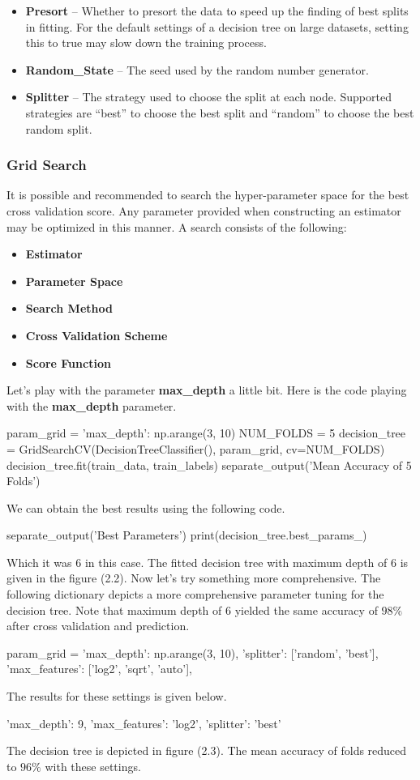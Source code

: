 \documentclass[12pt]{article}
\numberwithin{equation}{section}
\numberwithin{table}{section}
\numberwithin{figure}{section}
\begin{document}
\begin{itemize}
	\item \textbf{Presort} -- Whether to presort the data to speed up the finding of best splits in fitting. For the default settings of a decision tree on large datasets, setting this to true may slow down the training process.
	\item \textbf{Random\_State} -- The seed used by the random number generator.
	\item \textbf{Splitter} -- The strategy used to choose the split at each node. Supported strategies are “best” to choose the best split and “random” to choose the best random split.
\end{itemize}
\subsubsection{Grid Search}
It is possible and recommended to search the hyper-parameter space for the best cross validation score. Any parameter provided when constructing an estimator may be optimized in this manner\cite{scklearn2}. A search consists of the following: 
\begin{itemize}
	\item \textbf{Estimator}
	\item \textbf{Parameter Space}
	\item  \textbf{Search Method}
	\item \textbf{Cross Validation Scheme}
	\item \textbf{Score Function}
\end{itemize}
Let's play with the parameter \textbf{max\_depth} a little bit. Here is the code playing with the \textbf{max\_depth} parameter.
\begin{python}
	param_grid = {
		'max_depth': np.arange(3, 10)
	}
	NUM_FOLDS = 5
	decision_tree = GridSearchCV(DecisionTreeClassifier(), param_grid, cv=NUM_FOLDS)
	decision_tree.fit(train_data, train_labels)
	separate_output('Mean Accuracy of 5 Folds')
\end{python}
We can obtain the best results using the following code.
\begin{python}
	separate_output('Best Parameters')
	print(decision_tree.best_params_)
\end{python}
Which it was $6$ in this case. The fitted decision tree with maximum depth of $6$ is given in the figure (2.2). Now let's try something more comprehensive. The following dictionary depicts a more comprehensive parameter tuning for the decision tree. Note that maximum depth of $6$ yielded the same accuracy of $98\%$ after cross validation and prediction.
\begin{python}
	param_grid = {
		'max_depth': np.arange(3, 10),
		'splitter': ['random', 'best'],
		'max_features': ['log2', 'sqrt', 'auto'],
	}
\end{python}
The results for these settings is given below.
\begin{python}
		   {'max_depth': 9, 'max_features': 'log2', 'splitter': 'best'}
\end{python}
The decision tree is depicted in figure (2.3). The mean accuracy of folds reduced to $96\%$ with these settings.
\end{document}
